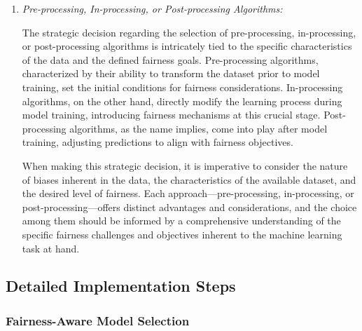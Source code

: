 \begin{enumerate}
    \item \emph{Pre-processing, In-processing, or Post-processing Algorithms:} 
    
    The strategic decision regarding the selection of pre-processing, in-processing, or post-processing algorithms is intricately tied to the specific characteristics of the data and the defined fairness goals. Pre-processing algorithms, characterized by their ability to transform the dataset prior to model training, set the initial conditions for fairness considerations. In-processing algorithms, on the other hand, directly modify the learning process during model training, introducing fairness mechanisms at this crucial stage. Post-processing algorithms, as the name implies, come into play after model training, adjusting predictions to align with fairness objectives.

    When making this strategic decision, it is imperative to consider the nature of biases inherent in the data, the characteristics of the available dataset, and the desired level of fairness. Each approach—pre-processing, in-processing, or post-processing—offers distinct advantages and considerations, and the choice among them should be informed by a comprehensive understanding of the specific fairness challenges and objectives inherent to the machine learning task at hand.

\end{enumerate}

\subsection{Detailed Implementation Steps}


\subsubsection{Fairness-Aware Model Selection}

